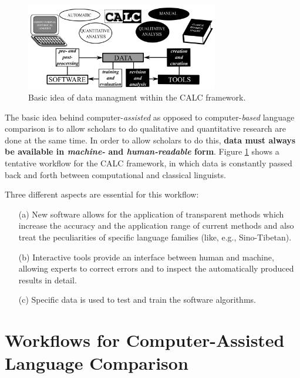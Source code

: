 \documentclass[xetex,svgnames]{scrartcl}
\begin{document}
\begin{figure}[htb]
  \centering
  \includegraphics[width=0.75\textwidth]{calc-figure-1.png}
  \caption{Basic idea of data managment within the CALC framework.}
  \label{fig:calc}
\end{figure}

The basic idea behind computer-\emph{assisted} as opposed to computer-\emph{based} language
comparison is to allow scholars to do qualitative and
quantitative research are done at the same time. In order to allow scholars to do this, \textbf{data
must always be available in \emph{machine-} and \emph{human-readable} form}.
Figure \ref{fig:calc} shows a tentative workflow for the CALC framework, in which data is constantly passed back and
forth between computational and classical linguists.

Three different aspects are essential for this workflow:
\begin{itemize}
  \item[(a)] New
software allows for the application of transparent methods which increase the accuracy and the application range
of current methods and also treat the peculiarities of specific language families (like, e.g.,
Sino-Tibetan).
\item[(b)] Interactive tools provide
an interface between human and machine, allowing experts to correct errors and to inspect the automatically
produced results in detail.
\item[(c)] Specific data is used to test and train the software algorithms.
  \end{itemize}



\section{Workflows for Computer-Assisted Language Comparison}
\end{document}
